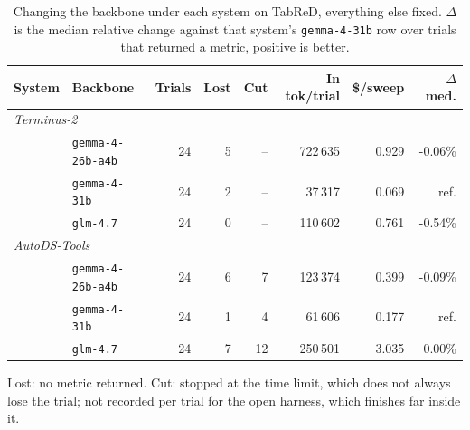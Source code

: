 \begin{table}[t]
\centering
\caption{Changing the backbone under each system on TabReD, everything else fixed. $\Delta$ is the median relative change against that system's \texttt{gemma-4-31b} row over trials that returned a metric, positive is better.}
\label{tab:modelaxis}
\small
\setlength{\tabcolsep}{4pt}
\begin{tabular}{llrrrrrr}
\toprule
System & Backbone & Trials & Lost & Cut & In tok/trial & \$/sweep & $\Delta$ med. \\
\midrule
\multicolumn{8}{l}{\itshape Terminus-2} \\
 & \texttt{gemma-4-26b-a4b} & 24 & 5 & -- & 722\,635 & 0.929 & -0.06\% \\
 & \texttt{gemma-4-31b} & 24 & 2 & -- & 37\,317 & 0.069 & ref. \\
 & \texttt{glm-4.7} & 24 & 0 & -- & 110\,602 & 0.761 & -0.54\% \\
\midrule
\multicolumn{8}{l}{\itshape AutoDS-Tools} \\
 & \texttt{gemma-4-26b-a4b} & 24 & 6 & 7 & 123\,374 & 0.399 & -0.09\% \\
 & \texttt{gemma-4-31b} & 24 & 1 & 4 & 61\,606 & 0.177 & ref. \\
 & \texttt{glm-4.7} & 24 & 7 & 12 & 250\,501 & 3.035 & 0.00\% \\
\bottomrule
\end{tabular}
\par\smallskip
\begin{minipage}{0.95\linewidth}\footnotesize Lost: no metric returned. Cut: stopped at the time limit, which does not always lose the trial; not recorded per trial for the open harness, which finishes far inside it.\end{minipage}
\end{table}
